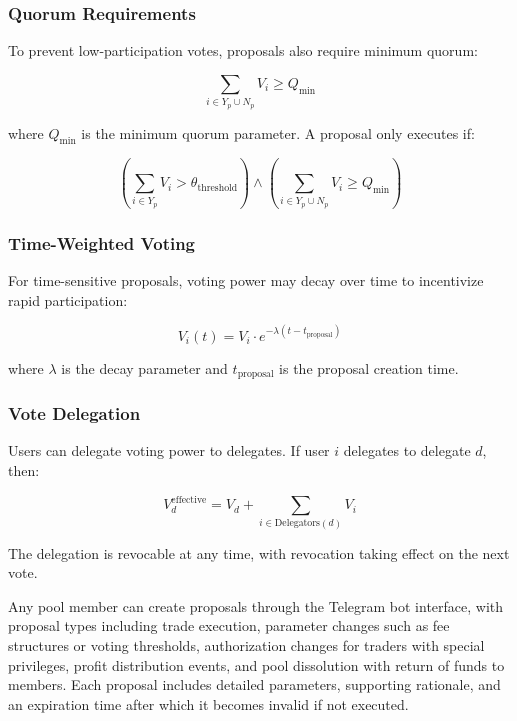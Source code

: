 \documentclass[11pt,a4paper]{article}
\begin{document}
\subsubsection{Quorum Requirements}

To prevent low-participation votes, proposals also require minimum quorum:

\begin{equation}
\sum_{i \in Y_p \cup N_p} V_i \geq Q_{\text{min}}
\end{equation}

where $Q_{\text{min}}$ is the minimum quorum parameter. A proposal only executes if:

\begin{equation}
\left(\sum_{i \in Y_p} V_i > \theta_{\text{threshold}}\right) \land \left(\sum_{i \in Y_p \cup N_p} V_i \geq Q_{\text{min}}\right)
\end{equation}

\subsubsection{Time-Weighted Voting}

For time-sensitive proposals, voting power may decay over time to incentivize rapid participation:

\begin{equation}
V_i(t) = V_i \cdot e^{-\lambda(t - t_{\text{proposal}})}
\end{equation}

where $\lambda$ is the decay parameter and $t_{\text{proposal}}$ is the proposal creation time.

\subsubsection{Vote Delegation}

Users can delegate voting power to delegates. If user $i$ delegates to delegate $d$, then:

\begin{equation}
V_d^{\text{effective}} = V_d + \sum_{i \in \text{Delegators}(d)} V_i
\end{equation}

The delegation is revocable at any time, with revocation taking effect on the next vote.

Any pool member can create proposals through the Telegram bot interface, with proposal types including trade execution, parameter changes such as fee structures or voting thresholds, authorization changes for traders with special privileges, profit distribution events, and pool dissolution with return of funds to members. Each proposal includes detailed parameters, supporting rationale, and an expiration time after which it becomes invalid if not executed.
\end{document}
